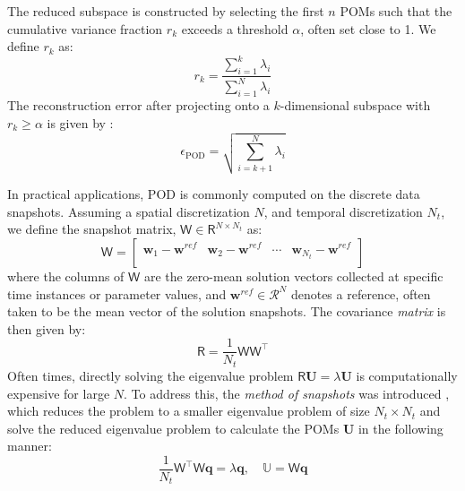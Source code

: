 \documentclass[11pt]{article}
\renewcommand{\vec}[1]{\mathbf{#1}}
\newcommand{\mat}[1]{\mathsf{#1}}
\begin{document}
The reduced subspace is constructed by selecting the first $n$ POMs such that the cumulative variance fraction $r_k$ exceeds a threshold $\alpha$, often set close to 1. We define $r_k$ as:
\begin{equation}
r_k = \frac{\sum_{i=1}^k \lambda_i}{\sum_{i=1}^N \lambda_i}
\label{eq:mode_sel}
\end{equation}
The reconstruction error after projecting onto a $k$-dimensional subspace with $r_k \geq \alpha$ is given by \cite{bhattacharyya2020energy}:
\begin{equation}
\epsilon_{\text{POD}} = \sqrt{\sum_{i=k+1}^N \lambda_i}
\end{equation}


In practical applications, POD is commonly computed on the discrete data snapshots. 
Assuming a spatial discretization $N$, and temporal discretization $N_t$, we define the snapshot matrix, \(\mat{W}\in\mathsf{R}^{N\times N_t}\) as:
\begin{equation}
	\mat{W}=\left[\begin{array}{cccc}
	\mathbf{w}_{1} - \mathbf{w}^{ref} & \mathbf{w}_{2} - \mathbf{w}^{ref}& \cdots & \mathbf{w}_{N_t} - \mathbf{w}^{ref}\\
	\end{array}\right]
\label{eq:data_W}
\end{equation}
where the columns of $\mat{W}$ are the zero-mean solution vectors collected at specific time instances or parameter values, and $\mathbf{w}^{ref}\in\mathcal{R}^{N}$ denotes a reference, often taken to be the mean vector of the solution snapshots. 
The covariance \textit{matrix} is then given by:
\begin{equation}
\mat{R} = \frac{1}{N_t}\mat{W}\mat{W}^\top
\label{eq:cor_mat}
\end{equation}
Often times, directly solving the eigenvalue problem \(\mat{R}\vec{U} = \lambda\vec{U}\) is computationally expensive for large \(N\). 
To address this, the \textit{method of snapshots} was introduced \cite{sirovich1987low-dimensional}, which reduces the problem to a smaller eigenvalue problem of size \(N_t \times N_t\) and solve the reduced eigenvalue problem to calculate the POMs $\vec{U}$ in the following manner:
\begin{equation}
\frac{1}{N_t}\mat{W}^\top\mat{W}\vec{q} = \lambda\vec{q}, \quad \mathbb{U} = \mat{W}\vec{q}
\end{equation}
\end{document}

